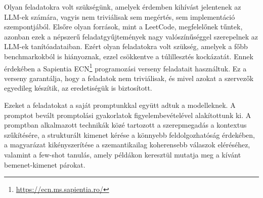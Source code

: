 \documentclass[12pt,a4paper]{extarticle}
\begin{document}
Olyan feladatokra volt szükségünk, amelyek érdemben kihívást jelentenek az LLM-ek számára, vagyis nem triviálisak sem megértés, sem implementáció szempontjából.
Elsőre olyan források, mint a LeetCode, megfelelőnek tűntek, azonban ezek a népszerű feladatgyűjtemények nagy valószínűséggel szerepelnek az LLM-ek tanítóadataiban.
Ezért olyan feladatokra volt szükség, amelyek a főbb benchmarkokból is hiányoznak, ezzel csökkentve a túlillesztés kockázatát.
Ennek érdekében a Sapientia ECN\footnote{\url{https://ecn.ms.sapientia.ro/}} programozási verseny feladatait használtuk.
Ez a verseny garantálja, hogy a feladatok nem triviálisak, és mivel azokat a szervezők egyedileg készítik, az eredetiségük is biztosított.


Ezeket a feladatokat a saját promptunkkal együtt adtuk a modelleknek.
A prompt\-ot bevált promptolási gyakorlatok figyelembevételével alakítottunk ki.
A promptban alkalmazott technikák közé tartozott a szerepmegadás a kontextus szűkítésére, a strukturált kimenet kérése a könnyebb feldolgozhatóság érdekében, a magyarázat kikényszerítése a szemantikailag koherensebb válaszok eléréséhez, valamint a few-shot tanulás, amely példákon keresztül mutatja meg a kívánt bemenet-kimenet párokat.
\end{document}

